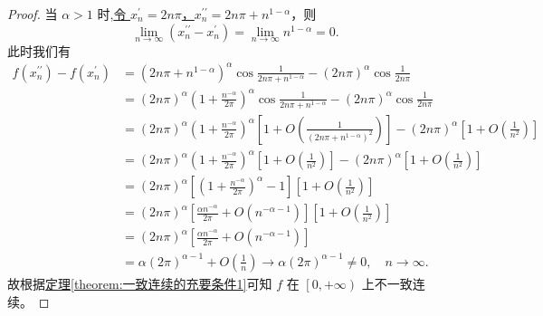 \documentclass[../../main.tex]{subfiles}
\begin{document}
\begin{proof}
当 $\alpha > 1$ 时,\hyperlink{找两个数列的方式123}{令 $x_{n}^{\prime} = 2n\pi$，$x_{n}^{\prime\prime} = 2n\pi + n^{1 - \alpha}$}，则
\[
\lim_{n \rightarrow \infty} \left( x_{n}^{\prime\prime} - x_{n}^{\prime} \right) = \lim_{n \rightarrow \infty} n^{1 - \alpha} = 0.
\]
此时我们有
\begin{align*}
f\left( x_{n}^{\prime\prime} \right) - f\left( x_{n}^{\prime} \right) &= \left( 2n\pi + n^{1 - \alpha} \right)^{\alpha} \cos \frac{1}{2n\pi + n^{1 - \alpha}} - \left( 2n\pi \right)^{\alpha} \cos \frac{1}{2n\pi} \\
&= \left( 2n\pi \right)^{\alpha} \left( 1 + \frac{n^{-\alpha}}{2\pi} \right)^{\alpha} \cos \frac{1}{2n\pi + n^{1 - \alpha}} - \left( 2n\pi \right)^{\alpha} \cos \frac{1}{2n\pi} \\
&= \left( 2n\pi \right)^{\alpha} \left( 1 + \frac{n^{-\alpha}}{2\pi} \right)^{\alpha} \left[ 1 + O\left( \frac{1}{\left( 2n\pi + n^{1 - \alpha} \right)^2} \right) \right] - \left( 2n\pi \right)^{\alpha} \left[ 1 + O\left( \frac{1}{n^2} \right) \right] \\
&= \left( 2n\pi \right)^{\alpha} \left( 1 + \frac{n^{-\alpha}}{2\pi} \right)^{\alpha} \left[ 1 + O\left( \frac{1}{n^2} \right) \right] - \left( 2n\pi \right)^{\alpha} \left[ 1 + O\left( \frac{1}{n^2} \right) \right] \\
&= \left( 2n\pi \right)^{\alpha} \left[ \left( 1 + \frac{n^{-\alpha}}{2\pi} \right)^{\alpha} - 1 \right] \left[ 1 + O\left( \frac{1}{n^2} \right) \right] \\
&= \left( 2n\pi \right)^{\alpha} \left[ \frac{\alpha n^{-\alpha}}{2\pi} + O\left( n^{-\alpha - 1} \right) \right] \left[ 1 + O\left( \frac{1}{n^2} \right) \right] \\
&= \left( 2n\pi \right)^{\alpha} \left[ \frac{\alpha n^{-\alpha}}{2\pi} + O\left( n^{-\alpha - 1} \right) \right] \\
&= \alpha \left( 2\pi \right)^{\alpha - 1} + O\left( \frac{1}{n} \right) \rightarrow \alpha \left( 2\pi \right)^{\alpha - 1} \ne 0, \quad n \rightarrow \infty.
\end{align*}
故根据\hyperref[theorem:一致连续的充要条件1]{定理\ref{theorem:一致连续的充要条件1}}可知 $f$ 在 $\left[ 0, +\infty \right)$ 上不一致连续。
\end{proof}
\end{document}

